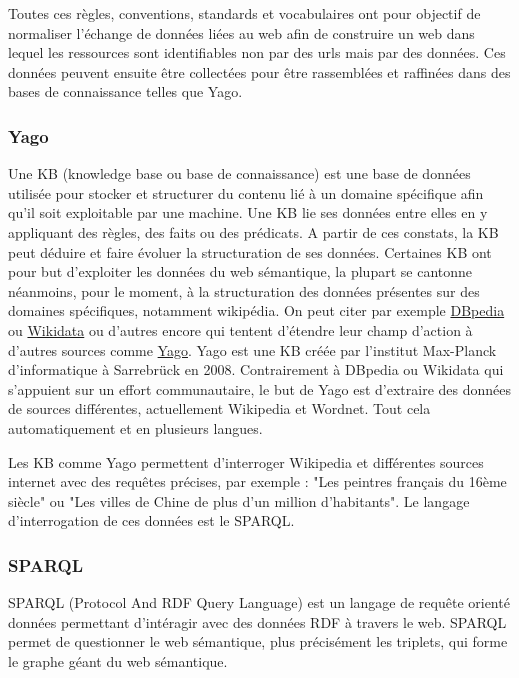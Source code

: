 \documentclass[french]{article}
\begin{document}
{Toutes ces règles, conventions, standards et vocabulaires ont pour objectif de normaliser l'échange de données liées au web afin de construire un web dans lequel les ressources sont identifiables non par des urls mais par des données. Ces données peuvent ensuite être collectées pour être rassemblées et raffinées dans des bases de connaissance telles que Yago.

\subsubsection{Yago}

Une KB (knowledge base ou base de connaissance) est une base de données utilisée pour stocker et structurer du contenu lié à un domaine spécifique afin qu'il soit exploitable par une machine. Une KB lie ses données entre elles en y appliquant des règles, des faits ou des prédicats. A partir de ces constats, la KB peut déduire et faire évoluer la structuration de ses données.
\newline{}
Certaines KB ont pour but d'exploiter les données du web sémantique, la plupart se cantonne néanmoins, pour le moment, à la structuration des données présentes sur des domaines spécifiques, notamment wikipédia. On peut citer par exemple \href{http://wiki.dbpedia.org/about}{DBpedia} ou \href{https://www.wikidata.org/wiki/Wikidata:Main_Page}{Wikidata} ou d'autres encore qui tentent d'étendre leur champ d'action à d'autres sources comme \href{http://www.mpi-inf.mpg.de/departments/databases-and-information-systems/research/yago-naga/yago/}{Yago}.
\newline{}
Yago est une KB créée par l'institut Max-Planck d'informatique à Sarrebrück en 2008. Contrairement à DBpedia ou Wikidata qui s'appuient sur un effort communautaire, le but de Yago est d'extraire des données de sources différentes, actuellement Wikipedia et Wordnet. Tout cela automatiquement et en plusieurs langues.

Les KB comme Yago permettent d'interroger Wikipedia et différentes sources internet avec des requêtes précises, par exemple : "Les peintres français du 16ème siècle" ou "Les villes de Chine de plus d'un million d'habitants".
Le langage d'interrogation de ces données est le SPARQL.

\subsubsection{SPARQL}

SPARQL (Protocol And RDF Query Language) est un langage de requête orienté données permettant d'intéragir avec des données RDF à travers le web. SPARQL permet de questionner le web sémantique, plus précisément les triplets, qui forme le graphe géant du web sémantique.

}
\end{document}

